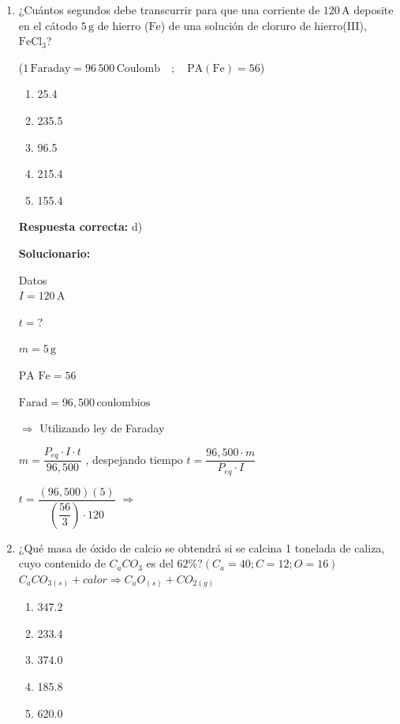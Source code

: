 \begin{enumerate}[resume]
	$\dfrac{P_1 V_1}{T_1} = \dfrac{P_2 V_2}{T_2}$

	$\dfrac{(2,400)(a^3)}{T} = \dfrac{P_2 \cdot \left(\dfrac{a}{4}\right)^3}{0.4T}$

	$\Rightarrow (0.4T)(2,400)(a^3) = \dfrac{P_2 (a^3) T}{64}$

	$\Rightarrow$ 

	\vspace{6mm}

	\item ¿Cuántos segundos debe transcurrir para que una corriente de $120 \, \text{A}$ deposite en el cátodo $5 \, \text{g}$ de hierro ($\text{Fe}$) de una solución de cloruro de hierro(III), $\text{FeCl}_3$?

	($1 \, \text{Faraday} = 96\,500 \, \text{Coulomb} \quad ; \quad \text{PA}(\text{Fe}) = 56$)
	\begin{enumerate}[label=\alph*)]
		\item 25.4
		\item 235.5
		\item 96.5
		\item 215.4
		\item 155.4
	\end{enumerate}
	\textbf{Respuesta correcta:} d)

	\vspace{2mm}
	\textbf{Solucionario:}\

	Datos\\
	$I = 120 \, \text{A}$

	$t = ?$

	$m = 5 \, \text{g}$

	$\text{PA Fe} = 56$

	$\text{Farad} = 96,500 \, \text{coulombios}$

	$\Rightarrow$ Utilizando ley de Faraday


	$m = \dfrac{P_{eq} \cdot I \cdot t}{96,500}$ , despejando tiempo $t = \dfrac{96,500 \cdot m}{P_{eq} \cdot I}$


	$t = \dfrac{(96,500)(5)}{\left( \dfrac{56}{3} \right) \cdot 120}$ $\Rightarrow$ 


	\item ¿Qué masa de óxido de calcio se obtendrá si se calcina 1 tonelada de caliza, cuyo contenido de $C_aCO_3$ es del $62\%?  (C_a = 40;C=12;O=16)$\\
	$C_aCO_{3(s)}+calor \Rightarrow  C_aO_{(s)}+CO_{2(g)}$

	\begin{enumerate}[label=\alph*)]
		\item 347.2
		\item 233.4
		\item 374.0
		\item 185.8
		\item 620.0
	\end{enumerate}


\end{enumerate}
